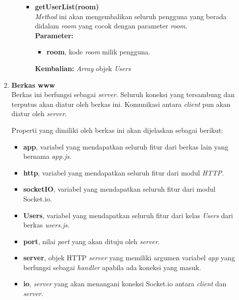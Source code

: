 \begin{enumerate}
\begin{enumerate}
\begin{itemize}
\begin{itemize}
				\item \textbf{getUserList(room)} \\
				\textit{Method} ini akan mengembalikan seluruh pengguna yang berada didalam \textit{room} yang cocok dengan parameter \textit{room}. \\
				\textbf{Parameter:}
				\begin{itemize}
					\item \textbf{room}, kode \textit{room} milik pengguna.
				\end{itemize}
				\textbf{Kembalian:} \textit{Array} objek \textit{Users}
			\end{itemize}
			
		\end{itemize}
	
		\item \textbf{Berkas www} \\
		Berkas ini berfungsi sebagai \textit{server}. Seluruh koneksi yang tersambung dan terputus akan diatur oleh berkas ini. Komunikasi antara \textit{client} pun akan diatur oleh \textit{server}.
		
		Properti yang dimiliki oleh berkas ini akan dijelaskan sebagai berikut:
		\begin{itemize}
			\item \textbf{app}, variabel yang mendapatkan seluruh fitur dari berkas lain yang bernama \textit{app.js}.
			\item \textbf{http}, variabel yang mendapatkan seluruh fitur dari modul \textit{HTTP}.
			\item \textbf{socketIO}, variabel yang mendapatkan seluruh fitur dari modul Socket.io.
			\item \textbf{{Users}}, variabel yang mendapatkan seluruh fitur dari kelas \textit{Users} dari berkas \textit{users.js}.
			\item \textbf{port}, nilai \textit{port} yang akan dituju oleh \textit{server}.
			\item \textbf{server}, objek HTTP \textit{server} yang memiliki argumen variabel \textit{app} yang berfungsi sebagai \textit{handler} apabila ada koneksi yang masuk.
			\item \textbf{io}, \textit{server} yang akan menangani koneksi Socket.io antara \textit{client} dan \textit{server}. 
		\end{itemize}
	

\end{enumerate}
\end{enumerate}
